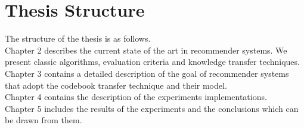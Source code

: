 \section{Thesis Structure}

The structure of the thesis is as follows.\\
Chapter 2 describes the current state of the art in recommender systems. We present classic algorithms, evaluation criteria and knowledge transfer techniques.\\
Chapter 3 contains a detailed description of the goal of recommender systems that adopt the codebook transfer technique and their model.\\
Chapter 4 contains the description of the experiments implementations.\\
Chapter 5 includes the results of the experiments and the conclusions which can be drawn from them.